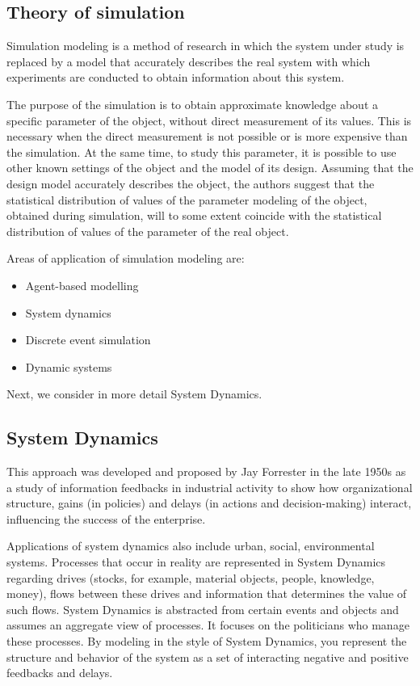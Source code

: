 \documentclass[12pt]{report}
\theoremstyle{definition}
\providecommand{\tightlist}{%
	\setlength{\itemsep}{0pt}\setlength{\parskip}{0pt}}
\begin{document}
\subsection{Theory of simulation}

Simulation modeling is a method of research in which the system under study is replaced by a model that accurately describes the real system with which experiments are conducted to obtain information about this system.

The purpose of the simulation is to obtain approximate knowledge about a specific parameter of the object, without direct measurement of its values. 
This is necessary when the direct measurement is not possible or is more expensive than the simulation.
At the same time, to study this parameter, it is possible to use other known settings of the object and the model of its design.
Assuming that the design model accurately describes the object, the authors suggest that the statistical distribution of values of the parameter modeling of the object, obtained during simulation, will to some extent coincide with the statistical distribution of values of the parameter of the real object.

Areas of application of simulation modeling are:

\begin{itemize}
	\tightlist
	\item Agent-based modelling
	\item System dynamics
	\item Discrete event simulation
	\item Dynamic systems
\end{itemize}

Next, we consider in more detail System Dynamics.

\subsection{System Dynamics}

This approach was developed and proposed by Jay Forrester in the late 1950s as a study of information feedbacks in industrial activity to show how organizational structure, gains (in policies) and delays (in actions and decision-making) interact, influencing the success of the enterprise.

Applications of system dynamics also include urban, social, environmental systems. Processes that occur in reality are represented in System Dynamics regarding drives (stocks, for example, material objects, people, knowledge, money), flows between these drives and information that determines the value of such flows.
System Dynamics is abstracted from certain events and objects and assumes an aggregate view of processes.
It focuses on the politicians who manage these processes.
By modeling in the style of System Dynamics, you represent the structure and behavior of the system as a set of interacting negative and positive feedbacks and delays.
\end{document}
